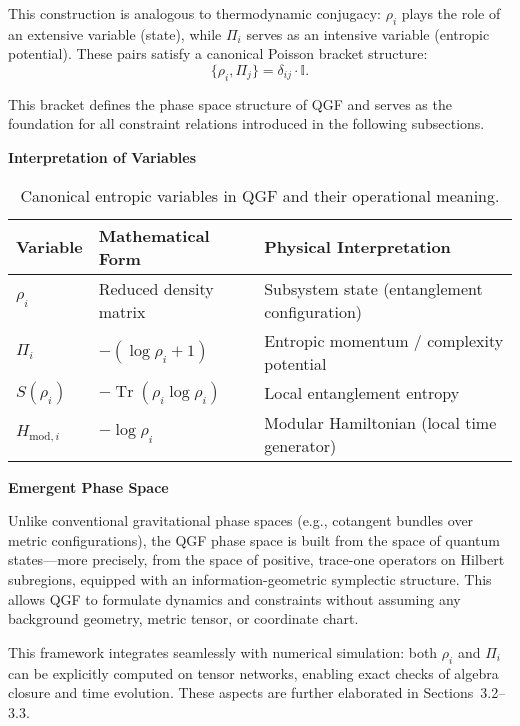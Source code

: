 \documentclass[11pt]{article}
\DeclareMathOperator*{\Tr}{Tr}
\begin{document}
This construction is analogous to thermodynamic conjugacy: \( \rho_i \) plays the role of an extensive variable (state), while \( \Pi_i \) serves as an intensive variable (entropic potential). These pairs satisfy a canonical Poisson bracket structure:
\[
\{ \rho_i, \Pi_j \} = \delta_{ij} \cdot \mathbb{I}.
\]

\noindent This bracket defines the phase space structure of QGF and serves as the foundation for all constraint relations introduced in the following subsections.

\vspace{0.8em}
\noindent\textbf{Interpretation of Variables}

\begin{table}[H]
\centering
\renewcommand{\arraystretch}{1.2}
\begin{tabular}{|l|l|l|}
\hline
\textbf{Variable} & \textbf{Mathematical Form} & \textbf{Physical Interpretation} \\
\hline
\( \rho_i \) & Reduced density matrix & Subsystem state (entanglement configuration) \\
\( \Pi_i \) & \( -(\log \rho_i + 1) \) & Entropic momentum / complexity potential \\
\( S(\rho_i) \) & \( -\Tr(\rho_i \log \rho_i) \) & Local entanglement entropy \\
\( H_{\text{mod},i} \) & \( -\log \rho_i \) & Modular Hamiltonian (local time generator) \\
\hline
\end{tabular}
\caption{Canonical entropic variables in QGF and their operational meaning.}
\label{tab:qgf-entropy-vars}
\end{table}

\vspace{0.8em}
\noindent\textbf{Emergent Phase Space}

Unlike conventional gravitational phase spaces (e.g., cotangent bundles over metric configurations), the QGF phase space is built from the space of quantum states—more precisely, from the space of positive, trace-one operators on Hilbert subregions, equipped with an information-geometric symplectic structure. This allows QGF to formulate dynamics and constraints without assuming any background geometry, metric tensor, or coordinate chart.

This framework integrates seamlessly with numerical simulation: both \( \rho_i \) and \( \Pi_i \) can be explicitly computed on tensor networks, enabling exact checks of algebra closure and time evolution. These aspects are further elaborated in Sections~3.2–3.3.
\end{document}
